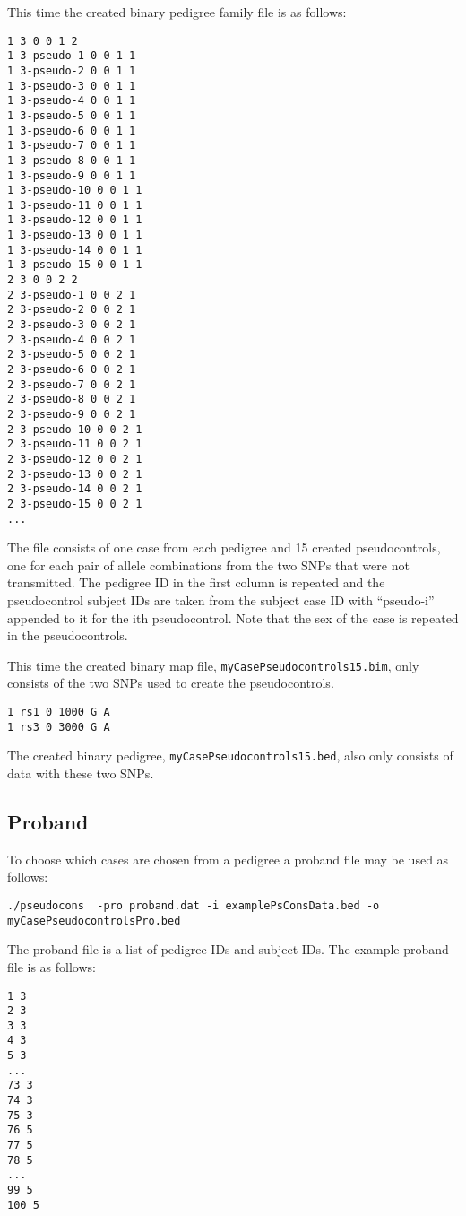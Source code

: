 \documentclass[a4paper,12pt]{article}
\newcommand{\code}[1]{{\footnotesize{{\tt #1}}}}
\begin{document}
This time the created binary pedigree family file is as follows: 
\begin{verbatim}
1 3 0 0 1 2
1 3-pseudo-1 0 0 1 1
1 3-pseudo-2 0 0 1 1
1 3-pseudo-3 0 0 1 1
1 3-pseudo-4 0 0 1 1
1 3-pseudo-5 0 0 1 1
1 3-pseudo-6 0 0 1 1
1 3-pseudo-7 0 0 1 1
1 3-pseudo-8 0 0 1 1
1 3-pseudo-9 0 0 1 1
1 3-pseudo-10 0 0 1 1
1 3-pseudo-11 0 0 1 1
1 3-pseudo-12 0 0 1 1
1 3-pseudo-13 0 0 1 1
1 3-pseudo-14 0 0 1 1
1 3-pseudo-15 0 0 1 1
2 3 0 0 2 2
2 3-pseudo-1 0 0 2 1
2 3-pseudo-2 0 0 2 1
2 3-pseudo-3 0 0 2 1
2 3-pseudo-4 0 0 2 1
2 3-pseudo-5 0 0 2 1
2 3-pseudo-6 0 0 2 1
2 3-pseudo-7 0 0 2 1
2 3-pseudo-8 0 0 2 1
2 3-pseudo-9 0 0 2 1
2 3-pseudo-10 0 0 2 1
2 3-pseudo-11 0 0 2 1
2 3-pseudo-12 0 0 2 1
2 3-pseudo-13 0 0 2 1
2 3-pseudo-14 0 0 2 1
2 3-pseudo-15 0 0 2 1
...
\end{verbatim}

The file consists of one case from each pedigree and 15 created pseudocontrols, one for each pair of allele combinations from the two SNPs that were not transmitted. The pedigree ID in the first column is repeated and the pseudocontrol subject IDs are taken from the subject case ID with ``pseudo-i'' appended to it for the ith pseudocontrol. Note that the sex of the case is repeated in the pseudocontrols. 

This time the created binary map file, \code{myCasePseudocontrols15.bim}, only consists of the two SNPs used to create the pseudocontrols. 
\begin{verbatim}
1 rs1 0 1000 G A
1 rs3 0 3000 G A
\end{verbatim}

The created binary pedigree, \code{myCasePseudocontrols15.bed}, also only consists of data with these two SNPs. 


\subsection{Proband}
\label{eg-proband}

To choose which cases are chosen from a pedigree a proband file may be used as follows: 
\begin{verbatim}
./pseudocons  -pro proband.dat -i examplePsConsData.bed -o myCasePseudocontrolsPro.bed
\end{verbatim}

The proband file is a list of pedigree IDs and subject IDs. The example proband file is as follows: 
\begin{verbatim}
1 3
2 3
3 3
4 3
5 3
...
73 3
74 3
75 3
76 5
77 5
78 5
...
99 5
100 5
\end{verbatim}
\end{document}
